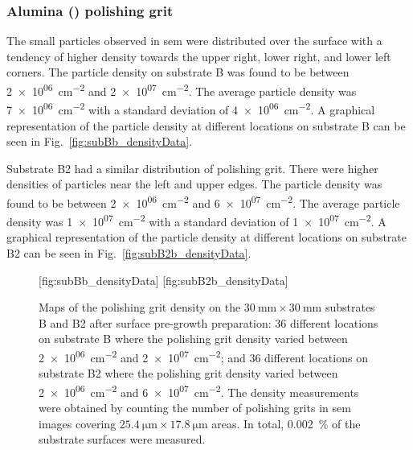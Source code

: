 \subsubsection{Alumina () polishing grit}

The small particles observed in \ac{sem} were distributed over the surface with a tendency of higher density towards the upper right, lower right, and lower left corners. The particle density on substrate B was found to be between \SI{2e+06}{\centi\metre^{-2}} and \SI{2e+07}{\centi\metre^{-2}}. The average particle density was \SI{7e+06}{\centi\metre^{-2}} with a standard deviation of \SI{4e+06}{\centi\metre^{-2}}. A graphical representation of the particle density at different locations on substrate B can be seen in Fig.~\ref{fig:subBb_densityData}.

Substrate B2 had a similar distribution of polishing grit. There were higher densities of particles near the left and upper edges. The particle density was found to be between \SI{2e+06}{\centi\metre^{-2}} and \SI{6e+07}{\centi\metre^{-2}}. The average particle density was \SI{1e+07}{\centi\metre^{-2}} with a standard deviation of \SI{1e+07}{\centi\metre^{-2}}. A graphical representation of the particle density at different locations on substrate B2 can be seen in Fig.~\ref{fig:subB2b_densityData}.

\begin{figure}[htbp]
    \centering
    [fig:subBb_densityData]
    \hfill
    [fig:subB2b_densityData]
    \caption[Maps of the polishing grit density on substrates B and B2 after surface pre-growth preparation.]{Maps of the polishing grit density on the $\SI{30}{\milli\metre}\times\SI{30}{\milli\metre}$ substrates B and B2 after surface pre-growth preparation:  36 different locations on substrate B where the polishing grit density varied between \SI{2e+06}{\centi\metre^{-2}} and \SI{2e+07}{\centi\metre^{-2}}; and  36 different locations on substrate B2 where the polishing grit density varied between \SI{2e+06}{\centi\metre^{-2}} and \SI{6e+07}{\centi\metre^{-2}}. The density measurements were obtained by counting the number of polishing grits in \ac{sem} images covering $\SI{25.4}{\micro\metre}\times\SI{17.8}{\micro\metre}$ areas. In total, \SI{0.002}{\percent} of the substrate surfaces were measured.}
    \label{fig:subBb_and_subB2b_densityData}
\end{figure}


